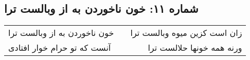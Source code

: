 \begin{center}
\section*{شماره ۱۱: خون ناخوردن به از وبالست ترا}
\label{sec:011}
\begin{longtable}{l p{0.5cm} r}
خون ناخوردن به از وبالست ترا
&&
زان است کزین میوه وبالست ترا
\\
آنست که تو حرام خوار افتادی
&&
ورنه همه خونها حلالست ترا
\\
\end{longtable}
\end{center}
